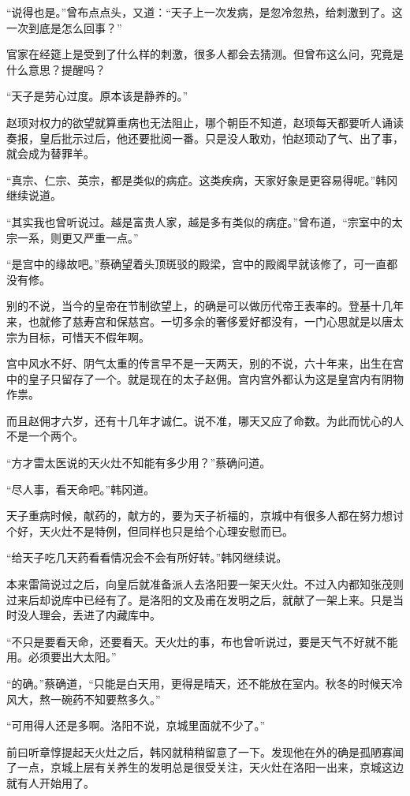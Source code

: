 “说得也是。”曾布点点头，又道：“天子上一次发病，是忽冷忽热，给刺激到了。这一次到底是怎么回事？”

官家在经筵上是受到了什么样的刺激，很多人都会去猜测。但曾布这么问，究竟是什么意思？提醒吗？

“天子是劳心过度。原本该是静养的。”

赵顼对权力的欲望就算重病也无法阻止，哪个朝臣不知道，赵顼每天都要听人诵读奏报，皇后批示过后，他还要批阅一番。只是没人敢劝，怕赵顼动了气、出了事，就会成为替罪羊。

“真宗、仁宗、英宗，都是类似的病症。这类疾病，天家好象是更容易得呢。”韩冈继续说道。

“其实我也曾听说过。越是富贵人家，越是多有类似的病症。”曾布道，“宗室中的太宗一系，则更又严重一点。”

“是宫中的缘故吧。”蔡确望着头顶斑驳的殿梁，宫中的殿阁早就该修了，可一直都没有修。

别的不说，当今的皇帝在节制欲望上，的确是可以做历代帝王表率的。登基十几年来，也就修了慈寿宫和保慈宫。一切多余的奢侈爱好都没有，一门心思就是以唐太宗为目标，可惜天不假年啊。

宫中风水不好、阴气太重的传言早不是一天两天，别的不说，六十年来，出生在宫中的皇子只留存了一个。就是现在的太子赵佣。宫内宫外都认为这是皇宫内有阴物作祟。

而且赵佣才六岁，还有十几年才诚仁。说不准，哪天又应了命数。为此而忧心的人不是一个两个。

“方才雷太医说的天火灶不知能有多少用？”蔡确问道。

“尽人事，看天命吧。”韩冈道。

天子重病时候，献药的，献方的，要为天子祈福的，京城中有很多人都在努力想讨个好，天火灶不是特例，但同样也只是给个心理安慰而已。

“给天子吃几天药看看情况会不会有所好转。”韩冈继续说。

本来雷简说过之后，向皇后就准备派人去洛阳要一架天火灶。不过入内都知张茂则过来后却说库中已经有了。是洛阳的文及甫在发明之后，就献了一架上来。只是当时没人理会，丢进了内藏库中。

“不只是要看天命，还要看天。天火灶的事，布也曾听说过，要是天气不好就不能用。必须要出大太阳。”

“的确。”蔡确道，“只能是白天用，更得是晴天，还不能放在室内。秋冬的时候天冷风大，熬一碗药不知要熬多久。”

“可用得人还是多啊。洛阳不说，京城里面就不少了。”

前曰听章惇提起天火灶之后，韩冈就稍稍留意了一下。发现他在外的确是孤陋寡闻了一点，京城上层有关养生的发明总是很受关注，天火灶在洛阳一出来，京城这边就有人开始用了。

